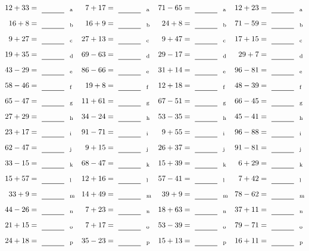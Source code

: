 \documentclass
[
  draft    = true,
  fontsize = 11pt,
  parskip  = half-
]
{scrartcl}
\begin{document}
\clearpage
\begin{align*}
    \pline{12+33}&=\rline{a}
  & \pline{7+17}&=\rline{a}
  & \pline{71-65}&=\rline{a}
  & \pline{12+23}&=\rline{a} \\[1ex]
    \pline{16+8}&=\rline{b}
  & \pline{16+9}&=\rline{b}
  & \pline{24+8}&=\rline{b}
  & \pline{71-59}&=\rline{b} \\[1ex]
    \pline{9+27}&=\rline{c}
  & \pline{27+13}&=\rline{c}
  & \pline{9+47}&=\rline{c}
  & \pline{17+15}&=\rline{c} \\[1ex]
    \pline{19+35}&=\rline{d}
  & \pline{69-63}&=\rline{d}
  & \pline{29-17}&=\rline{d}
  & \pline{29+7}&=\rline{d} \\[1ex]
    \pline{43-29}&=\rline{e}
  & \pline{86-66}&=\rline{e}
  & \pline{31+14}&=\rline{e}
  & \pline{96-81}&=\rline{e} \\[1ex]
    \pline{58-46}&=\rline{f}
  & \pline{19+8}&=\rline{f}
  & \pline{12+18}&=\rline{f}
  & \pline{48-39}&=\rline{f} \\[1ex]
    \pline{65-47}&=\rline{g}
  & \pline{11+61}&=\rline{g}
  & \pline{67-51}&=\rline{g}
  & \pline{66-45}&=\rline{g} \\[1ex]
    \pline{27+29}&=\rline{h}
  & \pline{34-24}&=\rline{h}
  & \pline{53-35}&=\rline{h}
  & \pline{45-41}&=\rline{h} \\[1ex]
    \pline{23+17}&=\rline{i}
  & \pline{91-71}&=\rline{i}
  & \pline{9+55}&=\rline{i}
  & \pline{96-88}&=\rline{i} \\[1ex]
    \pline{62-47}&=\rline{j}
  & \pline{9+15}&=\rline{j}
  & \pline{26+37}&=\rline{j}
  & \pline{91-81}&=\rline{j} \\[1ex]
    \pline{33-15}&=\rline{k}
  & \pline{68-47}&=\rline{k}
  & \pline{15+39}&=\rline{k}
  & \pline{6+29}&=\rline{k} \\[1ex]
    \pline{15+57}&=\rline{l}
  & \pline{12+16}&=\rline{l}
  & \pline{57-41}&=\rline{l}
  & \pline{7+42}&=\rline{l} \\[1ex]
    \pline{33+9}&=\rline{m}
  & \pline{14+49}&=\rline{m}
  & \pline{39+9}&=\rline{m}
  & \pline{78-62}&=\rline{m} \\[1ex]
    \pline{44-26}&=\rline{n}
  & \pline{7+23}&=\rline{n}
  & \pline{18+63}&=\rline{n}
  & \pline{37+11}&=\rline{n} \\[1ex]
    \pline{21+15}&=\rline{o}
  & \pline{7+17}&=\rline{o}
  & \pline{53-39}&=\rline{o}
  & \pline{79-71}&=\rline{o} \\[1ex]
    \pline{24+18}&=\rline{p}
  & \pline{35-23}&=\rline{p}
  & \pline{15+13}&=\rline{p}
  & \pline{16+11}&=\rline{p}
\end{align*}
\end{document}
